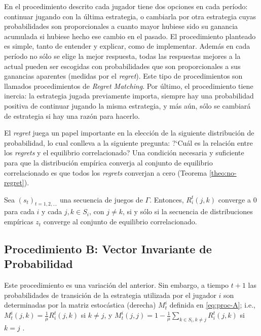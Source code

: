 En el procedimiento descrito cada jugador tiene dos opciones en cada período: continuar jugando con la última estrategia, o cambiarla por otra estrategia cuyas probabilidades son proporcionales a cuanto mayor hubiese sido su ganancia acumulada si hubiese hecho ese cambio en el pasado. El procedimiento planteado es simple, tanto de entender y explicar, como de implementar. Además en cada período no sólo se elige la mejor respuesta, todas las respuestas mejores a la actual pueden ser escogidas con probabilidades que son proporcionales a sus ganancias aparentes (medidas por el \textit{regret}). Este tipo de procedimientos son llamados procedimientos de \textit{Regret Matching}. Por último, el procedimiento tiene inercia: la estrategia jugada previamente importa, siempre hay una probabilidad positiva de continuar jugando la misma estrategia, y más aún, sólo se cambiará de estrategia si hay una razón para hacerlo.

El \textit{regret} juega un papel importante en la elección de la siguiente distribución de probabilidad, lo cual conlleva a la siguiente pregunta: ?`Cuál es la relación entre los \textit{regrets} y el equilibrio correlacionado? Una condición necesaria y suficiente para que la distribución empírica converja al conjunto de equilibrio correlacionado es que todos los \textit{regrets} converjan a cero (Teorema \ref{theo:no-regret}).

\begin{theorem}
\label{theo:no-regret}
Sea $(s_t)_{t = 1, 2, ...}$ una secuencia de juegos de $\Gamma$.
Entonces, $R_i^t(j, k)$ converge a $0$ para cada $i$ y cada $j, k \in S_i$, con $j \neq k$, si y sólo si la secuencia de distribuciones empíricas $z_t$ converge al conjunto de equilibrio correlacionado.
\end{theorem}

\subsection*{Procedimiento B: Vector Invariante de Probabilidad}

Este procedimiento es una variación del anterior. Sin embargo, a tiempo $t+1$ las probabilidades de transición de la estrategia utilizada por el jugador $i$ son determinadas por la matriz estocástica (derecha) $M^i_t$ definida en \eqref{eq:proc-A}; i.e., $M^i_t(j,k)=\frac{1}{\mu}R^t_i(j,k)$ si $k\neq j$, y $M^i_t(j,j)=1-\frac{1}{\mu}\sum_{k\in S_i,k\neq j} R^t_i(j,k)$ si $k=j$ \cite[p.~1133]{bib:correlated-equilibrium}.


